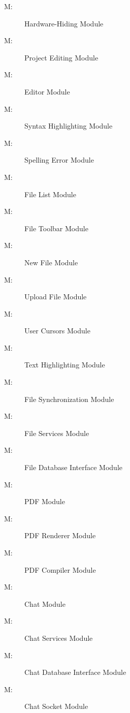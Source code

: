 \documentclass[12pt, titlepage]{article}
\newcounter{mnum}
\newcommand{\mthemnum}{M\themnum}
\begin{document}
	\begin{description}
		\item [ \mthemnum: \label{m1}] Hardware-Hiding Module
		\item [ \mthemnum: \label{m2}] Project Editing Module
		\item [ \mthemnum: \label{m3}] Editor Module
		\item [ \mthemnum: \label{m4}] Syntax Highlighting Module
		\item [ \mthemnum: \label{m5}] Spelling Error Module
		\item [ \mthemnum: \label{m6}] File List Module
		\item [ \mthemnum: \label{m7}] File Toolbar Module
		\item [ \mthemnum: \label{m8}] New File Module
		\item [ \mthemnum: \label{m9}] Upload File Module
		\item [ \mthemnum: \label{m10}] User Cursors Module
		\item [ \mthemnum: \label{m11}] Text Highlighting Module
		\item [ \mthemnum: \label{m12}] File Synchronization Module
		\item [ \mthemnum: \label{m13}] File Services Module
		\item [ \mthemnum: \label{m14}] File Database Interface Module
		\item [ \mthemnum: \label{m15}] PDF Module
		\item [ \mthemnum: \label{m16}] PDF Renderer Module
		\item [ \mthemnum: \label{m17}] PDF Compiler Module
		\item [ \mthemnum: \label{m18}] Chat Module
		\item [ \mthemnum: \label{m19}] Chat Services Module
		\item [ \mthemnum: \label{m20}] Chat Database Interface Module
		\item [ \mthemnum: \label{m21}] Chat Socket Module

\end{description}
\end{document}
